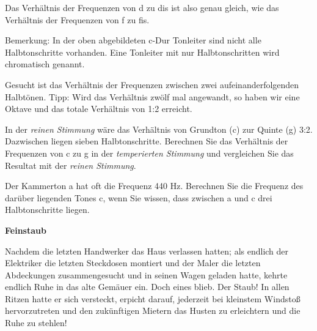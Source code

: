 Das Verhältnis der Frequenzen von d zu dis ist also genau gleich, wie
das Verhältnis der Frequenzen von f zu fis.

Bemerkung:  In der oben
abgebildeten c-Dur Tonleiter sind nicht alle Halbtonschritte
vorhanden. Eine Tonleiter mit nur Halbtonschritten wird chromatisch
genannt.

\begin{bbwAufgabenBlock}

\item Gesucht ist das Verhältnis der Frequenzen zwischen zwei aufeinanderfolgenden Halbtönen. Tipp: Wird
  das Verhältnis zwölf mal angewandt, so haben wir eine Oktave und das
  totale Verhältnis von 1:2 erreicht.


\item In der \textit{reinen Stimmung} wäre das Verhältnis von Grundton
  (c) zur Quinte (g) 3:2. Dazwischen liegen sieben
  Halbtonschritte. Berechnen Sie das Verhältnis der Frequenzen von c zu
  g in der \textit{temperierten Stimmung} und vergleichen Sie das
  Resultat mit der \textit{reinen Stimmung}.

  


\item Der Kammerton a hat oft die Frequenz 440 Hz. Berechnen Sie die
  Frequenz des darüber liegenden Tones c, wenn Sie wissen, dass
  zwischen a und c drei Halbtonschritte liegen.


    
\end{bbwAufgabenBlock}
\platzFuerBerechnungenBisEndeSeite{}



\bbwActAufgabenNr{} \textbf{Feinstaub}

Nachdem die letzten Handwerker das Haus verlassen hatten; als endlich der
Elektriker die letzten Steckdosen montiert und der Maler die letzten
Abdeckungen zusammengesucht und in seinen Wagen geladen hatte, kehrte
endlich Ruhe in das alte Gemäuer ein. Doch eines blieb. Der Staub!
In allen Ritzen hatte er sich versteckt, erpicht darauf,
jederzeit bei kleinstem Windstoß hervorzutreten und den zukünftigen
Mietern das Husten zu erleichtern und die Ruhe zu stehlen!

